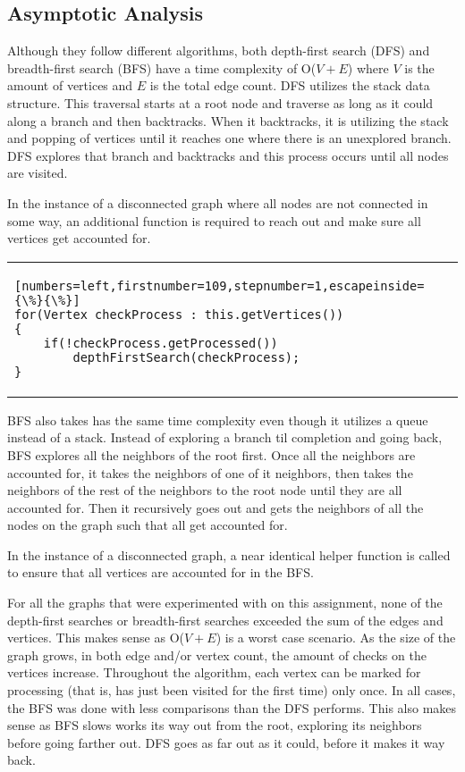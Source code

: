 \documentclass[letterpaper, 10pt,DIV=13]{scrartcl}
\numberwithin{equation}{section} %
\numberwithin{figure}{section} %
\numberwithin{table}{section} %
\begin{document}
\subsection{Asymptotic Analysis}

Although they follow different algorithms, both depth-first search (DFS) and breadth-first search (BFS) have a time complexity of O($V + E$) where $V$ is the amount of vertices and $E$ is the total edge count.  DFS utilizes the stack data structure.  This traversal starts at a root node and traverse as long as it could along a branch and then backtracks.  When it backtracks, it is utilizing the stack and popping of vertices until it reaches one where there is an unexplored branch.  DFS explores that branch and backtracks and this process occurs until all nodes are visited.

In the instance of a disconnected graph where all nodes are not connected in some way, an additional function is required to reach out and make sure all vertices get accounted for.

\begin{center}
\begin{tabular}{l}
\begin{lstlisting}[numbers=left,firstnumber=109,stepnumber=1,escapeinside={\%}{\%}]
for(Vertex checkProcess : this.getVertices())
{
    if(!checkProcess.getProcessed())
        depthFirstSearch(checkProcess);
}
\end{lstlisting}
\end{tabular}
\end{center}\textbf{}

BFS also takes has the same time complexity even though it utilizes a queue instead of a stack.  Instead of exploring a branch til completion and going back, BFS explores all the neighbors of the root first.  Once all the neighbors are accounted for, it takes the neighbors of one of it neighbors, then takes the neighbors of the rest of the neighbors to the root node until they are all accounted for.  Then it recursively goes out and gets the neighbors of all the nodes on the graph such that all get accounted for.

In the instance of a disconnected graph, a near identical helper function is called to ensure that all vertices are accounted for in the BFS.

For all the graphs that were experimented with on this assignment, none of the depth-first searches or breadth-first searches exceeded the sum of the edges and vertices.  This makes sense as O($V + E$) is a worst case scenario.  As the size of the graph grows, in both edge and/or vertex count, the amount of checks on the vertices increase.  Throughout the algorithm, each vertex can be marked for processing (that is, has just been visited for the first time) only once.    In all cases, the BFS was done with less comparisons than the DFS performs.  This also makes sense as BFS slows works its way out from the root, exploring its neighbors before going farther out.  DFS goes as far out as it could, before it makes it way back.
\end{document}
